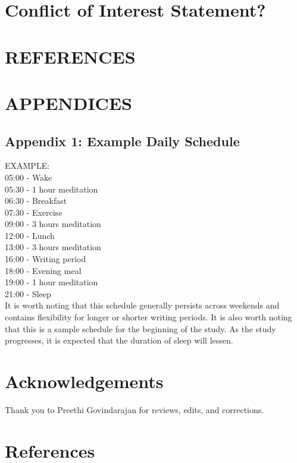 \documentclass[a4paper, amsfonts, amssymb, amsmath, reprint, showkeys, nofootinbib, twoside]{revtex4-1}
\begin{document}
\section{Conflict of Interest Statement?}

\section{REFERENCES}
\section{APPENDICES}

\subsection{Appendix 1: Example Daily Schedule}

EXAMPLE: \\
05:00 - Wake \\
05:30 - 1 hour meditation \\
06:30 - Breakfast \\
07:30 - Exercise \\
09:00 - 3 hours meditation \\
12:00 - Lunch \\
13:00 - 3 hours meditation \\
16:00 - Writing period \\
18:00 - Evening meal \\
19:00 - 1 hour meditation \\
21:00 - Sleep \\

It is worth noting that this schedule generally persists across weekends and contains
flexibility for longer or shorter writing periods.
It is also worth noting that this is a sample schedule for the beginning of the study.
As the study progresses, it is expected that the duration of sleep will lessen.

\section*{Acknowledgements}

Thank you to Preethi Govindarajan for reviews, edits, and corrections.


\section*{References}

{}


% 
\end{document}
